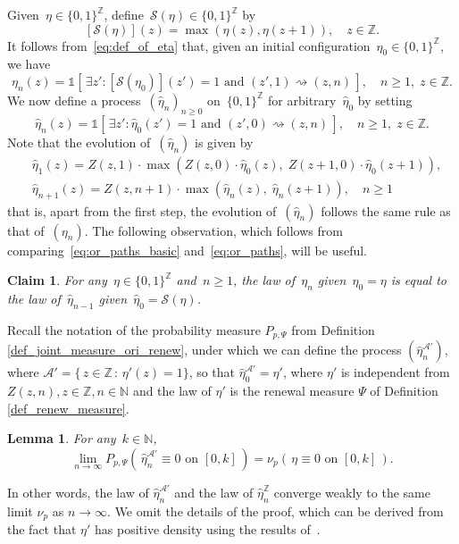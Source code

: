 \documentclass[a4paper,12pt]{article}
\newtheorem  {lemma}         [theorem]{Lemma}
\newtheorem  {claim}        [theorem]{Claim}
\newcommand{\Z}{\mathbb{Z}}
\begin{document}
Given~$\eta \in \{0,1\}^\Z$, define~$\mathcal{S}(\eta) \in \{0,1\}^\Z$ by
$$[\mathcal{S}(\eta)](z) = \max(\eta(z),\eta(z+1)),\quad z \in \Z.$$
It follows from~\eqref{eq:def_of_eta} that, given an initial configuration~$\eta_0 \in \{0,1\}^\Z$, we have
\begin{equation}\label{eq:or_paths_basic}
\eta_n(z) = \mathds{1}\left[ \, \exists z': [\mathcal{S}(\eta_0)](z') = 1 \text{ and } (z',1) \rightsquigarrow (z,n) \, \right],\quad n \geq 1,\;z \in \Z.\end{equation}
We now define a process~$(\hat{\eta}_n)_{n \geq 0}$ on~$\{0,1\}^\Z$ for arbitrary~$\hat{\eta}_0$  by setting
\begin{equation}\label{eq:or_paths}\hat{\eta}_n(z) = \mathds{1}\left[ \, \exists z': \hat{\eta}_0(z') = 1 \text{ and } (z',0) \rightsquigarrow (z,n) \, \right],\quad n \geq 1,\;z \in \Z.\end{equation}
Note that the evolution of~$(\hat{\eta}_n)$ is given by
\begin{align}
\label{hat_eta_first_step}
&\hat{\eta}_1(z) = Z(z,1)\cdot \max\left(Z(z,0)\cdot \hat{\eta}_0(z),\;Z(z+1,0) \cdot \hat{\eta}_0(z+1)\right),\\[.2cm]
\label{hat_eta_other_steps}
&\hat{\eta}_{n+1}(z) = Z(z,n+1) \cdot \max\left(\hat{\eta}_n(z),\; \hat{\eta}_n(z+1)\right),\quad n \geq 1
\end{align}
that is, apart from the first step, the evolution of~$(\hat{\eta}_n)$ follows the same rule as that of~$(\eta_n)$. The following observation, which follows from comparing~\eqref{eq:or_paths_basic} and~\eqref{eq:or_paths}, will be useful.
\begin{claim}\label{cl:or_1}
	For any~$\eta \in \{0,1\}^\Z$ and~$n \geq 1$, the law of~$\eta_n$ given~$\eta_0 = \eta$ is equal to the law of~$\hat{\eta}_{n-1}$ given~$\hat{\eta}_0 =\mathcal{S}(\eta)$.
\end{claim}


Recall the notation of the probability measure $P_{p,\Psi}$ from Definition \ref{def_joint_measure_ori_renew}, under which
we can define the process $(\hat{\eta}^{\mathcal{A}'}_n)$, where $\mathcal{A}'=\{ \, z \in \mathbb{Z}\, : \, \eta'(z)=1\}$, so that
$\hat{\eta}^{\mathcal{A}'}_0=\eta'$, where
  $\eta'$ is independent from $Z(z,n), z \in \mathbb{Z}, n \in \mathbb{N}$ and the law of $\eta'$ is the renewal measure $\Psi$ of Definition \ref{def_renew_measure}.
\begin{lemma} \label{lem:durr_or_perc}
	For any~$k \in \mathbb{N}$,
	\begin{equation}
\lim_{n \to \infty} P_{p,\Psi}\left(\, \hat{\eta}^{\mathcal{A}'}_n \equiv 0 \text{ on } [0,k] \, \right)=\nu_p(\, \eta \equiv 0 \text{ on } [0,k]  \, ).
\end{equation}
\end{lemma}
In other words, the law of $\hat{\eta}^{\mathcal{A}'}_n$ and the law of $\hat{\eta}^{\mathbb{Z}}_n$ converge weakly to the same limit $\nu_p$ as $n \to \infty$.
We omit the details of the proof, which can be derived from the fact that $\eta'$ has positive density using the results of~\cite{D84}.
\end{document}
